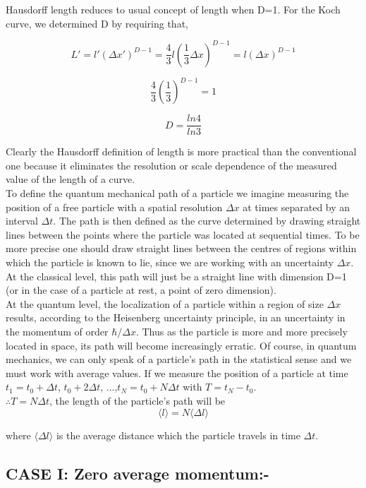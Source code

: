 \documentclass[14pt]{extarticle}
\begin{document}
Hausdorff length reduces to usual concept of length when D=1. For the Koch curve, we determined D by requiring that,

$$L'=l'(\Delta x')^{D-1}= \frac{4}{3}l \left( \frac{1}{3} \Delta x \right)^{D-1} = l(\Delta x)^{D-1}$$

$$\frac{4}{3} \left( \frac{1}{3} \right)^{D-1} =1$$

$$D= \frac{ln4}{ln3}$$

Clearly the Hausdorff definition of length is more practical than the conventional one because it eliminates the resolution or scale dependence of the measured value of the length of a curve.\\
To define the quantum mechanical path of a particle we imagine measuring the position of a free particle with a spatial resolution $\Delta x$ at times separated by an interval $\Delta t$. The path is then defined as the curve determined by drawing straight lines between the points where the particle was located at sequential times. To be more precise one should draw straight lines between the centres of regions within which the particle is known to lie, since we are working with an uncertainty $\Delta x$. At the classical level, this path will just be a straight line with dimension D=1 (or in the case of a particle at rest, a point of zero dimension).\\

At the quantum level, the localization of a particle within a region of size $\Delta x$ results, according to the Heisenberg uncertainty principle, in an uncertainty in the momentum of order $\hbar/\Delta x$.  Thus as the particle is more and more precisely located in space, its path will become increasingly erratic. Of course, in quantum mechanics, we can only speak of a particle's path in the statistical sense and we must work with average values. If we measure the position of a particle at time $t_1=t_0+\Delta t$, $t_0+2\Delta t$, ...,$t_N= t_0+N\Delta t$ with $T=t_N-t_0$.\\

$\therefore T=N\Delta t$, the length of the particle's path will be\\

$$\langle l \rangle = N \langle \Delta l \rangle$$

where $\langle \Delta l \rangle$ is the average distance which the particle travels in time $\Delta t$.

\subsection{CASE I: Zero average momentum:-}
\end{document}
